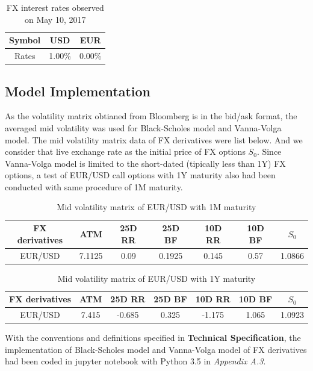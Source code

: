 \begin{table}[htb]
\centering
\caption{{FX interest rates observed on May 10, 2017}}
\begin{tabular}{ccc}
\hline	\hline %
Symbol & USD & EUR   \\ [1ex]%
\hline
Rates & 1.00\% & 0.00\%    \\ [1ex]
\hline
\end{tabular}
\label{table:FX_rates}
\end{table}

\subsection{Model Implementation}
As the volatility matrix obtianed from Bloomberg is in the bid/ask format, the averaged mid volatility was used for Black-Scholes model and Vanna-Volga model. The mid volatility matrix data of FX derivatives were list below. And we consider that live exchange rate as the initial price of FX options $S_0$.
\newline
\newline
Since Vanna-Volga model is limited to the short-dated (tipically less than 1Y) FX options, a test of EUR/USD call options with 1Y maturity also had been conducted with same procedure of 1M maturity.
\begin{table}[htb]
\centering
\caption{Mid volatility matrix of EUR/USD with 1M maturity}
\begin{tabular}{ccccccc}
\hline \hline
FX derivatives & ATM  & 25D RR  & 25D BF  & 10D RR  & 10D BF & $S_0$\\ [0.5ex]
\hline 
EUR/USD  & 7.1125 &0.09& 0.1925 &0.145 &0.57&1.0866 \\[0.5ex]
\hline
\end{tabular}
\end{table}

\begin{table}[htb]
	\centering
	\caption{Mid volatility matrix of EUR/USD with 1Y maturity}
	\begin{tabular}{ccccccc}
		\hline \hline
		FX derivatives & ATM  & 25D RR  & 25D BF  & 10D RR  & 10D BF & $S_0$\\ [0.5ex]
		\hline 
		EUR/USD  & 7.415&	-0.685&	0.325&	-1.175	&1.065 &1.0923\\[0.5ex]
		\hline
	\end{tabular}
\end{table}

\noindent
With the conventions and definitions specified in \textbf{Technical Specification}, the implementation of Black-Scholes model and Vanna-Volga model of FX derivatives had been coded in jupyter notebook with Python 3.5 in \textit{Appendix A.3}.

